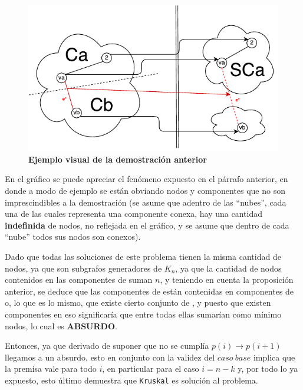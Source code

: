 \documentclass[11pt, a4paper, twoside]{article}
\begin{document}
\begin{samepage}
\begin{demostracion}
\begin{figure}[H]
   \begin{center}
   \includegraphics[width=1\textwidth]{diagrama_ej2.pdf}
   \caption{\textbf{Ejemplo visual de la demostración anterior}}
   \label{fig:ej2-1}
   \end{center}
\end{figure}

En el gráfico se puede apreciar el fenómeno expuesto en el párrafo anterior,
en donde a modo de ejemplo se están obviando nodos y componentes que no son
imprescindibles a la demostración (se asume que adentro de las ``nubes'', 
cada una de las cuales representa una componente conexa, hay
una cantidad \textbf{indefinida} de nodos, no reflejada en el gráfico, 
y se asume que dentro de cada ``nube'' todos sus nodos son conexos).

\end{demostracion}

\end{samepage}


Dado que todas las soluciones de este problema tienen la misma cantidad de
nodos, ya que son subgrafos generadores de $K_n$, ya que la cantidad de nodos
contenidos en las  componentes de  suman $n$,
y teniendo en cuenta la proposición anterior, se deduce que las
 componentes de  están contenidas en
 componentes de  o, lo que es lo
mismo, que existe cierto conjunto de , y puesto que existen
 componentes en  eso significaría que entre
todas ellas sumarían como mínimo  nodos, lo cual es
\textbf{ABSURDO}.

Entonces, ya que derivado de suponer que no se cumplía $p(i) \rightarrow p(i+1)$
llegamos a un absurdo, esto en conjunto con la validez del $caso~base$ implica
que la premisa vale para todo $i$, en particular para el caso $i=n-k$ y, por
todo lo ya expuesto, esto último demuestra que \texttt{Kruskal} es solución al
problema.
\end{document}
